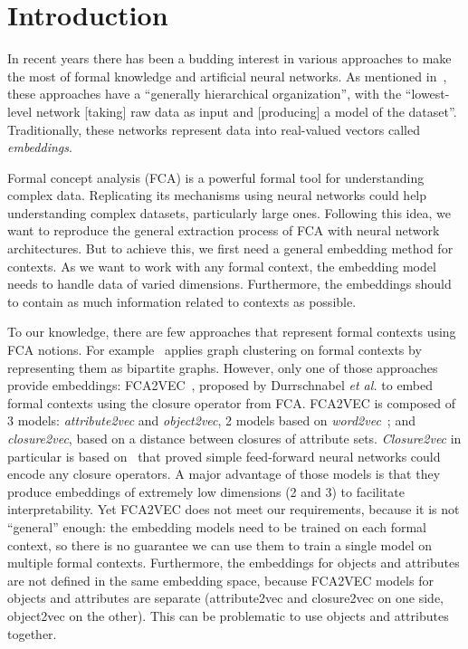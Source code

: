 \section{Introduction} %
In recent years there has been a budding interest in various approaches to make the most of formal knowledge and artificial neural networks.
As mentioned in~\cite[p. 6]{neuro-symbolic-survey:2017:many-authors}, these approaches have a ``generally hierarchical organization'', with the ``lowest-level network [taking] raw data as input and [producing] a model of the dataset''.
Traditionally, these networks represent data into real-valued vectors called \textit{embeddings}.

Formal concept analysis (FCA) is a powerful formal tool for understanding complex data.
Replicating its mechanisms using neural networks could help understanding complex datasets, particularly large ones.
Following this idea, we want to reproduce the general extraction process of FCA with neural network architectures.
But to achieve this, we first need a general embedding method for contexts.
As we want to work with any formal context, the embedding model needs to handle data of varied dimensions.
Furthermore, the embeddings should to contain as much information related to contexts as possible.

To our knowledge, there are few approaches that represent formal contexts using FCA notions.
For example~\cite{clustering-bipartie-closure:2013:gaume} applies graph clustering on formal contexts by representing them as bipartite graphs.
However, only one of those approaches provide embeddings:
FCA2VEC~\cite{fca2vec:2019:durrschnabel}, proposed by Durrschnabel \textit{et al.} to embed formal contexts using the closure operator from FCA.
FCA2VEC is composed of 3 models: \textit{attribute2vec} and \textit{object2vec}, 2 models based on \textit{word2vec}~\cite{word2vec:2013:mikolov}; 
and \textit{closure2vec}, based on a distance between closures of attribute sets.
\textit{Closure2vec} in particular is based on~\cite{encoding:2007:rudolph} that proved simple feed-forward neural networks could encode any closure operators.
A major advantage of those models is that they produce embeddings of extremely low dimensions (2 and 3) to facilitate interpretability.
%
Yet FCA2VEC does not meet our requirements, because it is not ``general'' enough:
the embedding models need to be trained on each formal context, so there is no guarantee we can use them to train a single model on multiple formal contexts.
Furthermore, the embeddings for objects and attributes are not defined in the same embedding space, because FCA2VEC models for objects and attributes are separate (attribute2vec and closure2vec on one side, object2vec on the other).
This can be problematic to use objects and attributes together.

